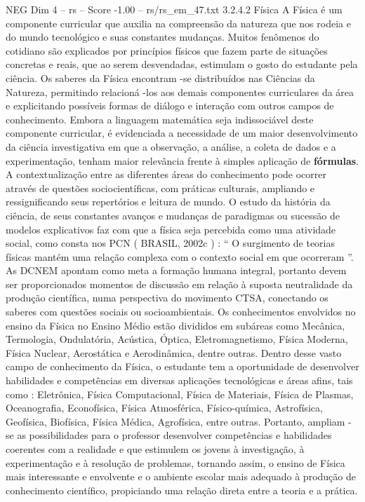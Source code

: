 \begin{textsample}{NEG Dim 4 – rs – Score -1.00 – rs/rs\_em\_47.txt}  \label{ex:f4_neg_195}
3.2.4.2 Física A Física é um componente curricular que auxilia na compreensão da natureza que nos rodeia e do mundo tecnológico e suas constantes mudanças.
Muitos fenômenos do cotidiano são explicados por princípios físicos que fazem parte de situações concretas e reais, que ao serem desvendadas, estimulam o gosto do estudante pela ciência.
Os saberes da Física encontram -se distribuídos nas Ciências da Natureza, permitindo relacioná -los aos demais componentes curriculares da área e explicitando possíveis formas de diálogo e interação com outros campos de conhecimento.
Embora a linguagem matemática seja indissociável deste componente curricular, é evidenciada a necessidade de um maior desenvolvimento da ciência investigativa em que a observação, a análise, a coleta de dados e a experimentação, tenham maior relevância frente à simples aplicação de \textbf{fórmulas}.
A contextualização entre as diferentes áreas do conhecimento pode ocorrer através de questões sociocientíficas, com práticas culturais, ampliando e ressignificando seus repertórios e leitura de mundo.
O estudo da história da ciência, de seus constantes avanços e mudanças de paradigmas ou sucessão de modelos explicativos faz com que a física seja percebida como uma atividade social, como consta nos PCN ( BRASIL, 2002c ) : “ O surgimento de teorias físicas mantém uma relação complexa com o contexto social em que ocorreram ”.
As DCNEM apontam como meta a formação humana integral, portanto devem ser proporcionados momentos de discussão em relação à suposta neutralidade da produção científica, numa perspectiva do movimento CTSA, conectando os saberes com questões sociais ou socioambientais.
Os conhecimentos envolvidos no ensino da Física no Ensino Médio estão divididos em subáreas como Mecânica, Termologia, Ondulatória, Acústica, Óptica, Eletromagnetismo, Física Moderna, Física Nuclear, Aerostática e Aerodinâmica, dentre outras.
Dentro desse vasto campo de conhecimento da Física, o estudante tem a oportunidade de desenvolver habilidades e competências em diversas aplicações tecnológicas e áreas afins, tais como : Eletrônica, Física Computacional, Física de Materiais, Física de Plasmas, Oceanografia, Econofísica, Física Atmosférica, Físico-química, Astrofísica, Geofísica, Biofísica, Física Médica, Agrofísica, entre outras.
Portanto, ampliam -se as possibilidades para o professor desenvolver competências e habilidades coerentes com a realidade e que estimulem os jovens à investigação, à experimentação e à resolução de problemas, tornando assim, o ensino de Física mais interessante e envolvente e o ambiente escolar mais adequado à produção de conhecimento científico, propiciando uma relação direta entre a teoria e a prática.

\end{textsample}
